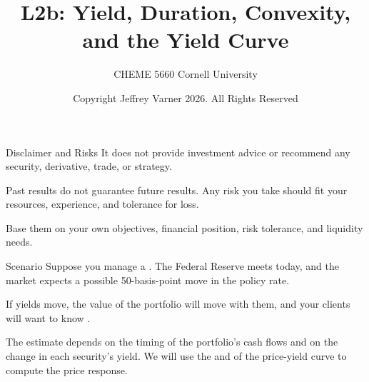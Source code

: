 \documentclass[aspectratio=169,11pt]{beamer}
\title{{\vnheavy L2b}: Yield, Duration, Convexity, and the Yield Curve}
\subtitle{CHEME 5660 Cornell University}
\author{Copyright Jeffrey Varner 2026. All Rights Reserved}
\begin{document}
\vntitlepage

\begin{frame}{Disclaimer and Risks}
  \vspace{1.0em}
  \textbf{} It does not
  provide investment advice or recommend any security, derivative, trade, or
  strategy.

  \vspace{1.2em}
  \textbf{} Past results do not guarantee future
  results. Any risk you take should fit your resources, experience, and
  tolerance for loss.

  \vspace{1.2em}
  \textbf{} Base them on your own
  objectives, financial position, risk tolerance, and liquidity needs.
\end{frame}

\begin{frame}{Scenario}
  \vspace{0.4em}
  Suppose you manage a . The Federal
  Reserve meets today, and the market expects a possible 50-basis-point move in
  the policy rate.

  \vspace{1.0em}
  If yields move, the value of the portfolio will move with them, and your
  clients will want to know .

  \vspace{1.0em}
  The estimate depends on the timing of the portfolio's cash flows and on the
  change in each security's yield. We will use the  and
   of the price-yield curve to compute the price response.

\end{frame}
\end{document}
